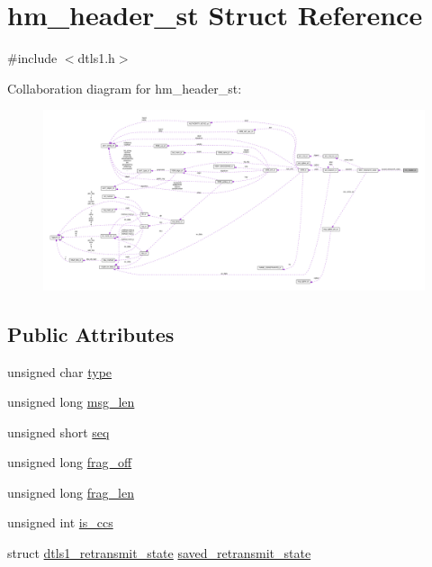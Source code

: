 \hypertarget{structhm__header__st}{}\section{hm\+\_\+header\+\_\+st Struct Reference}
\label{structhm__header__st}


{\ttfamily \#include $<$dtls1.\+h$>$}



Collaboration diagram for hm\+\_\+header\+\_\+st\+:
\nopagebreak
\begin{figure}[H]
\begin{center}
\leavevmode
\includegraphics[width=350pt]{structhm__header__st__coll__graph}
\end{center}
\end{figure}
\subsection*{Public Attributes}
\begin{DoxyCompactItemize}
\item 
unsigned char \hyperlink{structhm__header__st_afd990f37440d11253dd4d6f1cb5f227e}{type}
\item 
unsigned long \hyperlink{structhm__header__st_a0ad9536f7051da82c85e93cd61ac9f19}{msg\+\_\+len}
\item 
unsigned short \hyperlink{structhm__header__st_a724a245fd7883a93da6cf4d701654889}{seq}
\item 
unsigned long \hyperlink{structhm__header__st_a1971b139ea1f6985afdc19d548abe07a}{frag\+\_\+off}
\item 
unsigned long \hyperlink{structhm__header__st_aeabe85e8573ddb4dc5e662daf1d89285}{frag\+\_\+len}
\item 
unsigned int \hyperlink{structhm__header__st_a1443dd84e080fc01e0deabddc8974ec7}{is\+\_\+ccs}
\item 
struct \hyperlink{structdtls1__retransmit__state}{dtls1\+\_\+retransmit\+\_\+state} \hyperlink{structhm__header__st_aa53c97a266f1246009cef42c434a6f22}{saved\+\_\+retransmit\+\_\+state}
\end{DoxyCompactItemize}


